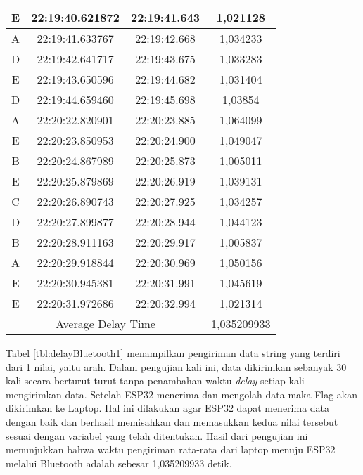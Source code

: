 \begin{longtable}{|ccc|c|}
  \multicolumn{1}{|c|}{E}    & \multicolumn{1}{c|}{22:19:40.621872} & 22:19:41.643       & 1,021128    \\ \hline
  \multicolumn{1}{|c|}{A}    & \multicolumn{1}{c|}{22:19:41.633767} & 22:19:42.668       & 1,034233    \\ \hline
  \multicolumn{1}{|c|}{D}    & \multicolumn{1}{c|}{22:19:42.641717} & 22:19:43.675       & 1,033283    \\ \hline
  \multicolumn{1}{|c|}{E}    & \multicolumn{1}{c|}{22:19:43.650596} & 22:19:44.682       & 1,031404    \\ \hline
  \multicolumn{1}{|c|}{D}    & \multicolumn{1}{c|}{22:19:44.659460} & 22:19:45.698       & 1,03854     \\ \hline
  \multicolumn{1}{|c|}{A}    & \multicolumn{1}{c|}{22:20:22.820901} & 22:20:23.885       & 1,064099    \\ \hline
  \multicolumn{1}{|c|}{E}    & \multicolumn{1}{c|}{22:20:23.850953} & 22:20:24.900       & 1,049047    \\ \hline
  \multicolumn{1}{|c|}{B}    & \multicolumn{1}{c|}{22:20:24.867989} & 22:20:25.873       & 1,005011    \\ \hline
  \multicolumn{1}{|c|}{E}    & \multicolumn{1}{c|}{22:20:25.879869} & 22:20:26.919       & 1,039131    \\ \hline
  \multicolumn{1}{|c|}{C}    & \multicolumn{1}{c|}{22:20:26.890743} & 22:20:27.925       & 1,034257    \\ \hline
  \multicolumn{1}{|c|}{D}    & \multicolumn{1}{c|}{22:20:27.899877} & 22:20:28.944       & 1,044123    \\ \hline
  \multicolumn{1}{|c|}{B}    & \multicolumn{1}{c|}{22:20:28.911163} & 22:20:29.917       & 1,005837    \\ \hline
  \multicolumn{1}{|c|}{A}    & \multicolumn{1}{c|}{22:20:29.918844} & 22:20:30.969       & 1,050156    \\ \hline
  \multicolumn{1}{|c|}{E}    & \multicolumn{1}{c|}{22:20:30.945381} & 22:20:31.991       & 1,045619    \\ \hline
  \multicolumn{1}{|c|}{E}    & \multicolumn{1}{c|}{22:20:31.972686} & 22:20:32.994       & 1,021314    \\ \hline
  \multicolumn{3}{|c|}{Average Delay Time}                                               & 1,035209933 \\ \hline
  \end{longtable}

Tabel \ref{tbl:delayBluetooth1} menampilkan pengiriman data string yang terdiri dari 1 nilai, yaitu arah. Dalam pengujian kali ini, data dikirimkan sebanyak 30 kali secara berturut-turut tanpa penambahan waktu \emph{delay} setiap kali mengirimkan data. Setelah ESP32 menerima dan mengolah data maka Flag akan dikirimkan ke Laptop. Hal ini dilakukan agar ESP32 dapat menerima data dengan baik dan berhasil memisahkan dan memasukkan kedua nilai tersebut sesuai dengan variabel yang telah ditentukan. Hasil dari pengujian ini menunjukkan bahwa waktu pengiriman rata-rata dari laptop menuju ESP32 melalui Bluetooth adalah sebesar 1,035209933 detik.

